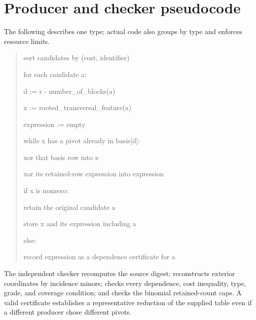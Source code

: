 \documentclass[11pt,a4paper]{article}
\theoremstyle{remark}\newtheorem{remark}[theorem]{Remark}
\begin{document}
\section{Producer and checker pseudocode}\label{app:algorithm}
The following describes one type; actual code also groups by type and enforces resource limits.
\begin{quote}\ttfamily\small
sort candidates by (cost, identifier)\par
for each candidate a:\par
\hspace*{1em}d := r - number\_of\_blocks(a)\par
\hspace*{1em}x := rooted\_transversal\_feature(a)\par
\hspace*{1em}expression := empty\par
\hspace*{1em}while x has a pivot already in basis[d]:\par
\hspace*{2em}xor that basis row into x\par
\hspace*{2em}xor its retained-row expression into expression\par
\hspace*{1em}if x is nonzero:\par
\hspace*{2em}retain the original candidate a\par
\hspace*{2em}store x and its expression including a\par
\hspace*{1em}else:\par
\hspace*{2em}record expression as a dependence certificate for a
\end{quote}
The independent checker recomputes the source digest; reconstructs exterior coordinates by incidence minors; checks every dependence, cost inequality, type, grade, and coverage condition; and checks the binomial retained-count caps. A valid certificate establishes a representative reduction of the supplied table even if a different producer chose different pivots.
\end{document}
